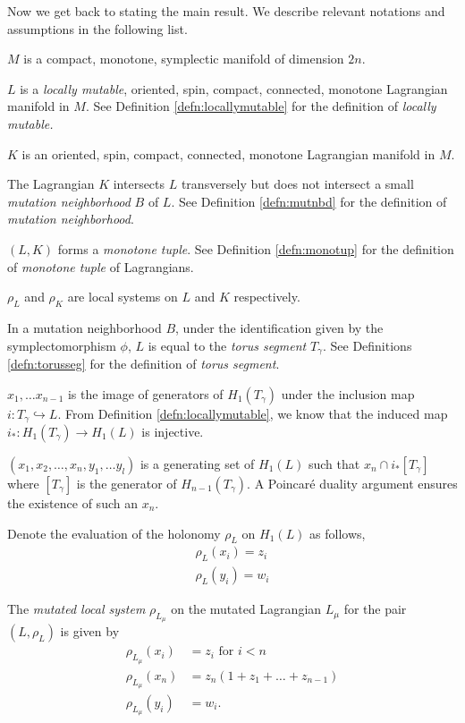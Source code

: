 Now we get back to stating the main result.  We describe relevant notations and assumptions in the following list. 
\begin{listC}
    \item $M$ is a compact, monotone, symplectic manifold of dimension $2n$.
    \item $L$ is a \textit{locally mutable},  oriented,  spin, compact, connected, monotone Lagrangian manifold in $M$. See Definition \ref{defn:locallymutable} for the definition of \textit{locally mutable.}
    \item $K$ is an oriented,  spin, compact, connected,  monotone Lagrangian manifold in $M$. 
    \item The Lagrangian $K$ intersects $L$ transversely but does not intersect a small \textit{mutation neighborhood} $B$ of $L$. See Definition \ref{defn:mutnbd} for  the definition of \textit{mutation neighborhood}.
    \item  $(L, K)$ forms a \textit{monotone tuple}. See Definition \ref{defn:monotup} for  the definition of \textit{monotone tuple} of Lagrangians.
    \item $\rho_L$ and $\rho_K$ are local systems on $L$ and $K$ respectively.
    \item In a mutation neighborhood $B$,  under the identification given by the symplectomorphism $\phi$,  $L$ is equal to the \textit{torus segment} $T_\gamma$. See Definitions \ref{defn:torusseg} for  the definition of \textit{torus segment}.
    \item $x_1, \dots x_{n-1}$ is the image of generators of $H_1(T_\gamma)$ under the inclusion map $i:T_\gamma \hookrightarrow L$.  From Definition \ref{defn:locallymutable}, we know that the induced map $i_* : H_1(T_\gamma) \to H_1(L)$ is injective.
    \item $(x_1, x_2, \dots, x_n,  y_1, \dots y_l)$ is a generating set of $H_1(L)$ such that $x_n \cap i_*[T_\gamma]$ where $[T_\gamma]$ is the generator of $H_{n-1}(T_\gamma)$. A Poincar\'{e} duality argument ensures the existence of such an $x_n$.
\end{listC}



Denote the evaluation of the holonomy $\rho_L$ on $H_1(L)$ as follows, 
\begin{align}
    \rho_L(x_i)=z_i  \label{eq:one}\\
    \rho_L(y_i)=w_i \nonumber
\end{align}


\begin{defn}
  The  \textit{mutated local system} $\rho_{L_\mu}$ on the mutated Lagrangian $L_\mu$ for the pair $(L, \rho_L)$ is given by 
\begin{align} 
    \rho_{L_\mu}(x_i)&=z_i \text{ for } i<n   \label{eq:two}\\
    \rho_{L_\mu}(x_n)&=z_n(1+z_1 + \dots + z_{n-1}) \nonumber \\
    \rho_{L_\mu}(y_i)&=w_i \nonumber.   
\end{align}
\end{defn}

